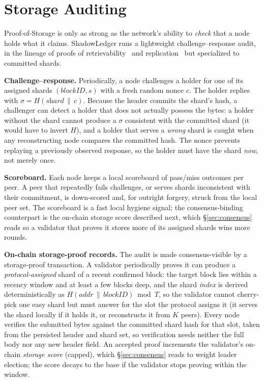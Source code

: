 \section{Storage Auditing}
\label{sec:audit}
Proof-of-Storage is only as strong as the network's ability to \emph{check} that a node holds
what it claims. ShadowLedger runs a lightweight challenge--response audit, in the lineage of
proofs of retrievability~\cite{juels2007pors} and replication~\cite{fisch2018scaling} but
specialized to committed shards.

\textbf{Challenge--response.} Periodically, a node challenges a holder for one of its assigned
shards $(\textit{blockID},s)$ with a fresh random nonce $c$. The holder replies with
$\sigma=H(\textit{shard}\,\|\,c)$. Because the header commits the shard's hash, a challenger can
detect a holder that does not actually possess the bytes: a holder without the shard cannot
produce a $\sigma$ consistent with the committed shard (it would have to invert $H$), and a
holder that serves a \emph{wrong} shard is caught when any reconstructing node compares the
committed hash. The nonce prevents replaying a previously observed response, so the holder must
have the shard \emph{now}, not merely once.

\textbf{Scoreboard.} Each node keeps a local scoreboard of pass/miss outcomes per peer. A peer
that repeatedly fails challenges, or serves shards inconsistent with their commitment, is
down-scored and, for outright forgery, struck from the local peer set. The scoreboard is a fast local
hygiene signal; the consensus-binding counterpart is the on-chain storage score described next,
which \S\ref{sec:consensus} reads so a validator that proves it stores more of its assigned shards
wins more rounds.

\textbf{On-chain storage-proof records.} The audit is made consensus-visible by a storage-proof
transaction. A validator periodically proves it can produce a \emph{protocol-assigned} shard of a
recent confirmed block: the target block lies within a recency window and at least a few blocks
deep, and the shard \emph{index} is derived deterministically as $H(\textit{addr}\,\|\,
\textit{blockID})\bmod T$, so the validator cannot cherry-pick one easy shard but must answer for
the slot the protocol assigns it (it serves the shard locally if it holds it, or reconstructs it
from $K$ peers). Every node verifies the submitted bytes against the committed shard hash for that
slot, taken from the persisted header and shard set, so verification needs neither the full body
nor any new header field. An accepted proof increments the validator's on-chain
\emph{storage score} (capped), which \S\ref{sec:consensus} reads to weight leader election; the
score decays to the base if the validator stops proving within the window.


